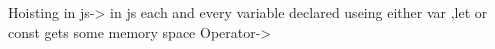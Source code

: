 Hoisting in js-> in js each and every variable declared useing either var ,let or const gets some memory space
Operator->